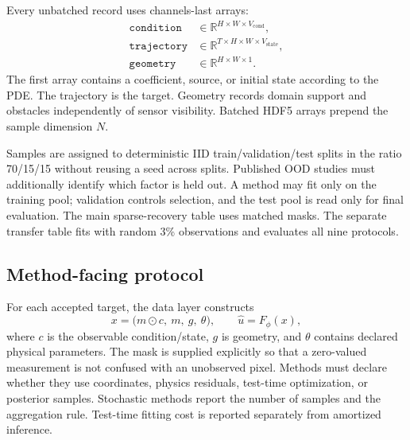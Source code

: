 \documentclass[10pt]{article}
\newcommand{\R}{\mathbb{R}}
\begin{document}
Every unbatched record uses channels-last arrays:
\begin{align}
  \texttt{condition}&\in\R^{H\times W\times V_{\mathrm{cond}}},\\
  \texttt{trajectory}&\in\R^{T\times H\times W\times V_{\mathrm{state}}},\\
  \texttt{geometry}&\in\R^{H\times W\times 1}.
\end{align}
The first array contains a coefficient, source, or initial state according to
the PDE.  The trajectory is the target.  Geometry records domain support and
obstacles independently of sensor visibility.  Batched HDF5 arrays prepend the
sample dimension $N$.

Samples are assigned to deterministic IID train/validation/test splits in the
ratio 70/15/15 without reusing a seed across splits.  Published OOD studies
must additionally identify which factor is held out.  A method may fit only on
the training pool; validation controls selection, and the test pool is read
only for final evaluation.  The main sparse-recovery table uses matched masks.
The separate transfer table fits with random 3\% observations and evaluates all
nine protocols.

\subsection{Method-facing protocol}

For each accepted target, the data layer constructs
\begin{equation}
  x = \bigl(m\odot c,\ m,\ g,\ \theta\bigr),
  \qquad \widehat{u}=F_{\phi}(x),
\end{equation}
where $c$ is the observable condition/state, $g$ is geometry, and $\theta$
contains declared physical parameters.  The mask is supplied explicitly so
that a zero-valued measurement is not confused with an unobserved pixel.
Methods must declare whether they use coordinates, physics residuals, test-time
optimization, or posterior samples.  Stochastic methods report the number of
samples and the aggregation rule.  Test-time fitting cost is reported
separately from amortized inference.
\end{document}
